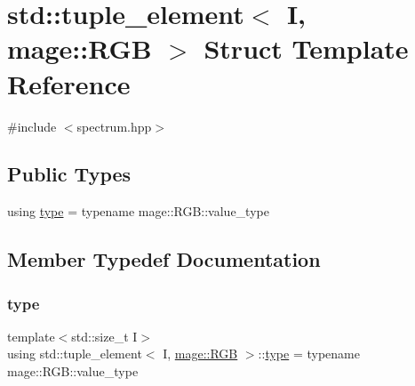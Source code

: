 \hypertarget{structstd_1_1tuple__element_3_01_i_00_01mage_1_1_r_g_b_01_4}{}\section{std\+:\+:tuple\+\_\+element$<$ I, mage\+:\+:R\+GB $>$ Struct Template Reference}
\label{structstd_1_1tuple__element_3_01_i_00_01mage_1_1_r_g_b_01_4}


{\ttfamily \#include $<$spectrum.\+hpp$>$}

\subsection*{Public Types}
\begin{DoxyCompactItemize}
\item 
using \mbox{\hyperlink{structstd_1_1tuple__element_3_01_i_00_01mage_1_1_r_g_b_01_4_ad0224ad81727664636c99c365d17b2c7}{type}} = typename mage\+::\+R\+G\+B\+::value\+\_\+type
\end{DoxyCompactItemize}


\subsection{Member Typedef Documentation}
\mbox{\label{structstd_1_1tuple__element_3_01_i_00_01mage_1_1_r_g_b_01_4_ad0224ad81727664636c99c365d17b2c7}} 
\subsubsection{\texorpdfstring{type}{type}}
{\footnotesize\ttfamily template$<$std\+::size\+\_\+t I$>$ \\
using std\+::tuple\+\_\+element$<$ I, \mbox{\hyperlink{structmage_1_1_r_g_b}{mage\+::\+R\+GB}} $>$\+::\mbox{\hyperlink{structstd_1_1tuple__element_3_01_i_00_01mage_1_1_r_g_b_01_4_ad0224ad81727664636c99c365d17b2c7}{type}} =  typename mage\+::\+R\+G\+B\+::value\+\_\+type}

